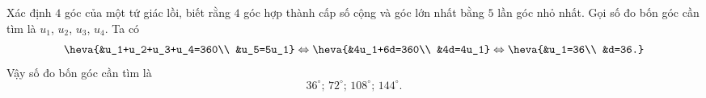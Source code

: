 			

\begin{vd}%
	Xác định $4$ góc của một tứ giác lồi, biết rằng $4$ góc hợp thành cấp số cộng và góc lớn nhất bằng $5$ lần góc nhỏ nhất.
	\loigiai
	{
		Gọi số đo bốn góc cần tìm là $u_1$, $u_2$, $u_3$, $u_4$. Ta có
		\begin{eqnarray*}
			\heva{&u_1+u_2+u_3+u_4=360\\ &u_5=5u_1} \Leftrightarrow \heva{&4u_1+6d=360\\ &4d=4u_1} \Leftrightarrow \heva{&u_1=36\\ &d=36.}
		\end{eqnarray*}
		Vậy số đo bốn góc cần tìm là
		\[
		36^\circ; \, 72^\circ; \, 108^\circ; \, 144^\circ.
		\]
	}
\end{vd}

